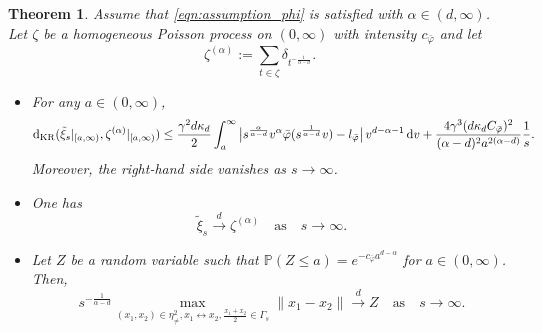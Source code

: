 \documentclass{article}
\newtheorem{theorem}{Theorem}[section]
\theoremstyle{definition}
\numberwithin{equation}{section}
\theoremstyle{remark}
\begin{document}
\begin{theorem}\label{thm:edge-length_process}
Assume that \eqref{eqn:assumption_phi} is satisfied with $\alpha\in(d,\infty)$. Let $\zeta$ be a homogeneous Poisson process on $(0,\infty)$ with intensity $c_{\bar{\varphi}}$ and let
$$
\zeta^{(\alpha)}:= \sum_{t\in\zeta} \delta_{t^{-\frac{1}{\alpha-d}}}.
$$
\begin{itemize}
\item [a)] For any $a\in(0,\infty)$,
$$
\mathrm{d}_{\rm KR}(\tilde{\xi}_s|_{[a,\infty)},\zeta^{(\alpha)}|_{[a,\infty)}) \leq \frac{\gamma^2 d \kappa_d }{2}\int_a^\infty \big|s^{\frac{\alpha}{\alpha-d}}v^{\alpha} \bar{\varphi}(s^{\frac{1}{\alpha-d}}v) -l_{\bar{\varphi}}\big| \, v^{d-\alpha-1}\, \mathrm{d}v + \frac{4\gamma^3 (d\kappa_d C_{\bar{\varphi}})^2}{(\alpha-d)^2 a^{2(\alpha-d)}} \frac{1}{s}.
$$
Moreover, the right-hand side vanishes as $s\to\infty$.
\item [b)] One has
$$
\tilde{\xi}_s\overset{d}{\longrightarrow} \zeta^{(\alpha)}\quad \text{as} \quad s\to\infty.
$$
\item [c)] 
Let $Z$ be a random variable such that $\mathbb{P}(Z\leq a)=e^{-c_{\bar{\varphi}}a^{d-\alpha}}$ for $a\in(0,\infty)$. Then,
$$
s^{-\frac{1}{\alpha-d}}\max_{(x_1,x_2)\in\eta_{\neq}^2, x_1\leftrightarrow x_2, \frac{x_1+x_2}{2}\in\Gamma_s} \|x_1-x_2\| \overset{d}{\longrightarrow} Z \quad \text{as} \quad s\to\infty.
$$
\end{itemize}
\end{theorem}
\end{document}

